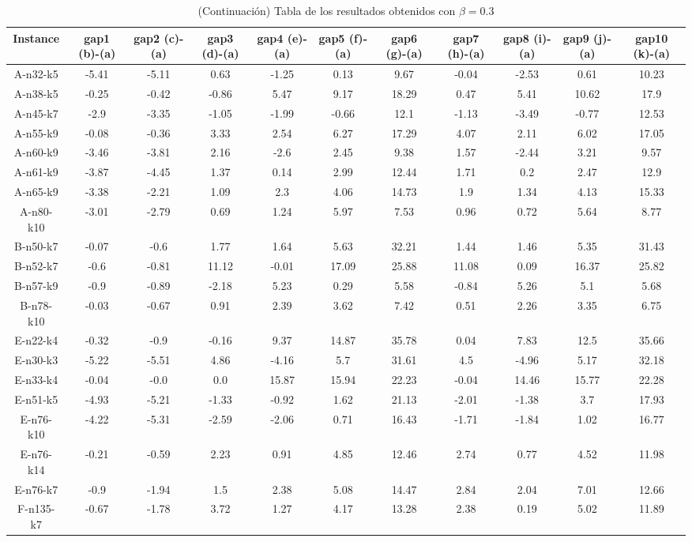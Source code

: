 \documentclass[11pt]{article} %
\begin{document}
\begin{enumerate}
\begin{landscape}
\begin{table}[p]
\centering
\begin{small}
\caption{(Continuación) Tabla de los resultados obtenidos con $\beta = 0.3$}
\begin{tabular}{ccccccccccc}
\toprule
Instance & gap1 (b)-(a) &          gap2 (c)-(a) &       gap3 (d)-(a) &       gap4 (e)-(a) &       gap5 (f)-(a) &       gap6 (g)-(a) &       gap7 (h)-(a) &       gap8 (i)-(a) &       gap9 (j)-(a) &      gap10 (k)-(a) \\
\midrule
A-n32-k5&-5.41&-5.11&0.63&-1.25&0.13&9.67&-0.04&-2.53&0.61&10.23 \\
A-n38-k5&-0.25&-0.42&-0.86&5.47&9.17&18.29&0.47&5.41&10.62&17.9 \\
A-n45-k7&-2.9&-3.35&-1.05&-1.99&-0.66&12.1&-1.13&-3.49&-0.77&12.53 \\
A-n55-k9&-0.08&-0.36&3.33&2.54&6.27&17.29&4.07&2.11&6.02&17.05 \\ 
A-n60-k9&-3.46&-3.81&2.16&-2.6&2.45&9.38&1.57&-2.44&3.21&9.57 \\
A-n61-k9&-3.87&-4.45&1.37&0.14&2.99&12.44&1.71&0.2&2.47&12.9 \\ 
A-n65-k9&-3.38&-2.21&1.09&2.3&4.06&14.73&1.9&1.34&4.13&15.33 \\
A-n80-k10&-3.01&-2.79&0.69&1.24&5.97&7.53&0.96&0.72&5.64&8.77 \\
B-n50-k7&-0.07&-0.6&1.77&1.64&5.63&32.21&1.44&1.46&5.35&31.43 \\
B-n52-k7&-0.6&-0.81&11.12&-0.01&17.09&25.88&11.08&0.09&16.37&25.82 \\
B-n57-k9&-0.9&-0.89&-2.18&5.23&0.29&5.58&-0.84&5.26&5.1&5.68 \\
B-n78-k10&-0.03&-0.67&0.91&2.39&3.62&7.42&0.51&2.26&3.35&6.75 \\
E-n22-k4&-0.32&-0.9&-0.16&9.37&14.87&35.78&0.04&7.83&12.5&35.66 \\
E-n30-k3&-5.22&-5.51&4.86&-4.16&5.7&31.61&4.5&-4.96&5.17&32.18 \\
E-n33-k4&-0.04&-0.0&0.0&15.87&15.94&22.23&-0.04&14.46&15.77&22.28 \\
E-n51-k5&-4.93&-5.21&-1.33&-0.92&1.62&21.13&-2.01&-1.38&3.7&17.93 \\
E-n76-k10&-4.22&-5.31&-2.59&-2.06&0.71&16.43&-1.71&-1.84&1.02&16.77 \\
E-n76-k14&-0.21&-0.59&2.23&0.91&4.85&12.46&2.74&0.77&4.52&11.98 \\
E-n76-k7&-0.9&-1.94&1.5&2.38&5.08&14.47&2.84&2.04&7.01&12.66 \\
F-n135-k7&-0.67&-1.78&3.72&1.27&4.17&13.28&2.38&0.19&5.02&11.89 \\

\end{tabular}
\end{small}
\end{table}
\end{landscape}
\end{enumerate}
\end{document}
